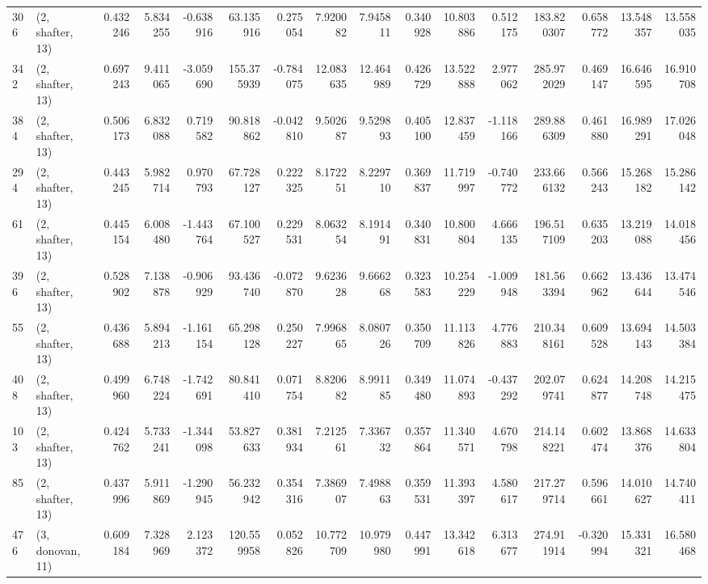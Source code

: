 \begin{tabular}{llrrrrrrrrrrrrrr}
306 &  (2, shafter, 13) &   0.432246 &   5.834255 &  -0.638916 &    63.135916 &   0.275054 &   7.920082 &   7.945811 &  0.340928 &  10.803886 &   0.512175 &   183.820307 &   0.658772 &  13.548357 &  13.558035 \\
342 &  (2, shafter, 13) &   0.697243 &   9.411065 &  -3.059690 &   155.375939 &  -0.784075 &  12.083635 &  12.464989 &  0.426729 &  13.522888 &   2.977062 &   285.972029 &   0.469147 &  16.646595 &  16.910708 \\
384 &  (2, shafter, 13) &   0.506173 &   6.832088 &   0.719582 &    90.818862 &  -0.042810 &   9.502687 &   9.529893 &  0.405100 &  12.837459 &  -1.118166 &   289.886309 &   0.461880 &  16.989291 &  17.026048 \\
294 &  (2, shafter, 13) &   0.443245 &   5.982714 &   0.970793 &    67.728127 &   0.222325 &   8.172251 &   8.229710 &  0.369837 &  11.719997 &  -0.740772 &   233.666132 &   0.566243 &  15.268182 &  15.286142 \\
61  &  (2, shafter, 13) &   0.445154 &   6.008480 &  -1.443764 &    67.100527 &   0.229531 &   8.063254 &   8.191491 &  0.340831 &  10.800804 &   4.666135 &   196.517109 &   0.635203 &  13.219088 &  14.018456 \\
396 &  (2, shafter, 13) &   0.528902 &   7.138878 &  -0.906929 &    93.436740 &  -0.072870 &   9.623628 &   9.666268 &  0.323583 &  10.254229 &  -1.009948 &   181.563394 &   0.662962 &  13.436644 &  13.474546 \\
55  &  (2, shafter, 13) &   0.436688 &   5.894213 &  -1.161154 &    65.298128 &   0.250227 &   7.996865 &   8.080726 &  0.350709 &  11.113826 &   4.776883 &   210.348161 &   0.609528 &  13.694143 &  14.503384 \\
408 &  (2, shafter, 13) &   0.499960 &   6.748224 &  -1.742691 &    80.841410 &   0.071754 &   8.820682 &   8.991185 &  0.349480 &  11.074893 &  -0.437292 &   202.079741 &   0.624877 &  14.208748 &  14.215475 \\
103 &  (2, shafter, 13) &   0.424762 &   5.733241 &  -1.344098 &    53.827633 &   0.381934 &   7.212561 &   7.336732 &  0.357864 &  11.340571 &   4.670798 &   214.148221 &   0.602474 &  13.868376 &  14.633804 \\
85  &  (2, shafter, 13) &   0.437996 &   5.911869 &  -1.290945 &    56.232942 &   0.354316 &   7.386907 &   7.498863 &  0.359531 &  11.393397 &   4.580617 &   217.279714 &   0.596661 &  14.010627 &  14.740411 \\
476 &  (3, donovan, 11) &   0.609184 &   7.328969 &   2.123372 &   120.559958 &   0.052826 &  10.772709 &  10.979980 &  0.447991 &  13.342618 &   6.313677 &   274.911914 &  -0.320994 &  15.331321 &  16.580468 \\

\end{tabular}
